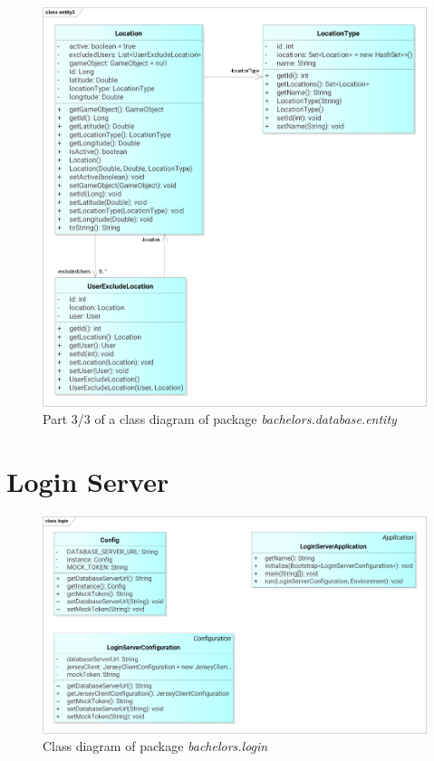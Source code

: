 \begin{figure}[h]	
	\includegraphics[width=\textwidth]{figures/classdiagrams/dsentity3}
	\centering			
	\caption{Part 3/3 of a class diagram of package \textit{bachelors.database.entity}}
\end{figure}




\section{Login Server}

\begin{figure}[h]	
	\includegraphics[width=\textwidth]{figures/classdiagrams/lslogin}
	\centering			
	\caption{Class diagram of package \textit{bachelors.login}}
\end{figure}

